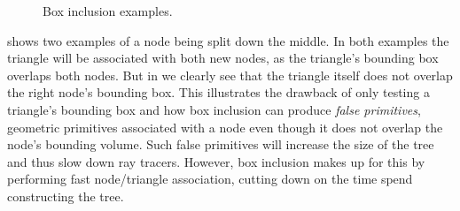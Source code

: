 \begin{figure}
  \centering
  \caption{Box inclusion examples.}
  \label{fig:boxInclusion}
\end{figure}


 shows two examples of a node being split down the
middle. In both examples the triangle will be associated with both new nodes, as
the triangle's bounding box overlaps both nodes. But in
 we clearly see that the triangle itself does not
overlap the right node's bounding box. This illustrates the drawback of only
testing a triangle's bounding box and how box inclusion can produce
\textit{false primitives}, geometric primitives associated with a node even
though it does not overlap the node's bounding volume. Such false primitives
will increase the size of the tree and thus slow down ray tracers. However, box
inclusion makes up for this by performing fast node/triangle association,
cutting down on the time spend constructing the tree.









